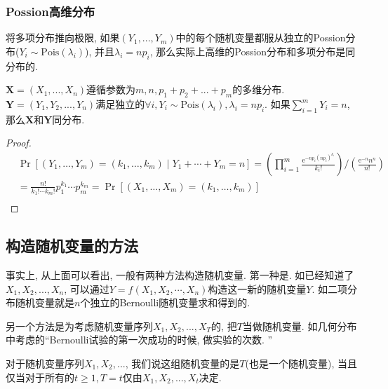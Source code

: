 \documentclass{ctexart}
\begin{document}
\subsubsection{Possion高维分布} 将多项分布推向极限, 如果$(Y_1, ..., Y_m)$中的每个随机变量都服从独立的Possion分布($Y_i \sim \text{Pois}(\lambda_i)$), 并且$\lambda_i = np_i$, 那么实际上高维的Possion分布和多项分布是同分布的. 

\begin{prop}
    $\boldsymbol X=(X_1, ..., X_n)$遵循参数为$m, n, p_1+p_2+ ... +p_m$的多维分布. $\boldsymbol Y=(Y_1, Y_2, ..., Y_n)$满足独立的$\forall i, Y_i \sim \text{Pois}(\lambda_i), \lambda_i=np_i$. 如果$\sum_{i=1}^mY_i = n$, 那么$\boldsymbol X$和$\boldsymbol Y$同分布. 
\end{prop}

\begin{proof}
    $$
\begin{aligned}
& \operatorname{Pr}\left[\left(Y_1, \ldots, Y_m\right)=\left(k_1, \ldots, k_m\right) \mid Y_1+\cdots+Y_m=n\right]=\left(\prod_{i=1}^m \frac{\mathrm{e}^{-n p_i\left(n p_i\right)^{k_i}}}{k_{i}!}\right) /\left(\frac{\mathrm{e}^{-n} n^n}{n!}\right) \\
& =\frac{n!}{k_{1}!\cdots k_{m}!} p_1^{k_1} \cdots p_m^{k_m}=\operatorname{Pr}\left[\left(X_1, \ldots, X_m\right)=\left(k_1, \ldots, k_m\right)\right] \\
&
\end{aligned}
$$
\end{proof}


\subsection{构造随机变量的方法}

事实上, 从上面可以看出, 一般有两种方法构造随机变量. 第一种是. 如已经知道了$X_1, X_2, ..., X_n$, 可以通过$Y=f(X_1, X_2, \cdots, X_n)$构造这一新的随机变量$Y$. 如二项分布随机变量就是$n$个独立的Bernoulli随机变量求和得到的. 

另一个方法是为考虑随机变量序列$X_1, X_2, ..., X_T$的, 把$T$当做随机变量. 如几何分布中考虑的``Bernoulli试验的第一次成功的时候, 做实验的次数. ''

\begin{definition}[随机变量的停止时间]
    对于随机变量序列$X_1, X_2, ...$, 我们说这组随机变量的是$T$(也是一个随机变量), 当且仅当对于所有的$t\geq 1, T=t$仅由$X_1, X_2, ..., X_t$决定.  
\end{definition}
\end{document}
